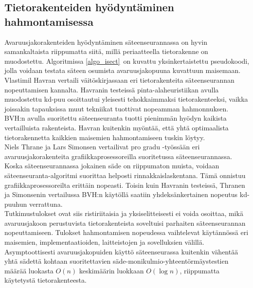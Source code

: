 \documentclass[a4paper, 12pt, titlepage]{article}
\begin{document}


\subsection{Tietorakenteiden hyödyntäminen hahmontamisessa}

Avaruusjakorakenteiden hyödyntäminen säteenseurannassa on hyvin samankaltaista riippumatta siitä, millä periaatteella tietorakenne on muodostettu. Algoritmissa \ref{algo_isect} on kuvattu yksinkertaistettu pseudokoodi, jolla voidaan testata säteen osumista avaruusjakopuuna kuvattuun maisemaan.\\ 



Vlastimil Havran vertaili väitöskirjassaan eri tietorakenteita säteenseurannan nopeuttamisen kannalta. Havranin testeissä pinta-alaheuristiikan avulla muodostettu kd-puu osoittautui yleisesti tehokkaimmaksi tietorakenteeksi, vaikka joissakin tapauksissa muut tekniikat tuottivat nopeamman hahmonnuksen. BVH:n avulla suoritettu säteenseuranta tuotti pienimmän hyödyn kaikista vertailluista rakenteista. Havran kuitenkin myöntää, että yhtä optimaalista tietorakennetta kaikkien maisemien hahmontamiseen tuskin löytyy. \citep[.]{havran}\\

Niels Thrane ja Lars Simonsen vertailivat pro gradu -työssään eri avaruusjakorakenteita grafiikkaprosessoreilla suoritetussa säteenseurannassa. Koska säteenseurannassa jokainen säde on riippumaton muista, voidaan säteenseuranta-algoritmi suorittaa helposti rinnakkaislaskentana. Tämä onnistuu grafiikkaprosessoreilta erittäin nopeasti. Toisin kuin Havranin testeissä, Thranen ja Simonsenin vertailussa BVH:n käytöllä saatiin yhdeksänkertainen nopeutus kd-puuhun verrattuna. \citep[.]{thrane}\\  

Tutkimustulokset ovat siis ristiriitaisia ja yksiselitteisesti ei voida osoittaa, mikä avaruusjakoon perustuvista tietorakenteista soveltuisi parhaiten säteenseurannan nopeuttamiseen. Tulokset hahmontamisen nopeudessa vaihtelevat käytännössä eri maisemien, implementaatioiden, laitteistojen ja sovelluksien välillä. \citep[.]{wald04}  Asymptoottisesti avaruusjakopuiden käyttö säteenseurassa kuitenkin vähentää yhtä sädettä kohtaan suoritettavien säde-monikulmio-yhteentörmäystestien määrää luokasta $O(n)$ keskimäärin luokkaan $O(\log n)$, riippumatta käytetystä tietorakenteesta. \\
\end{document}
